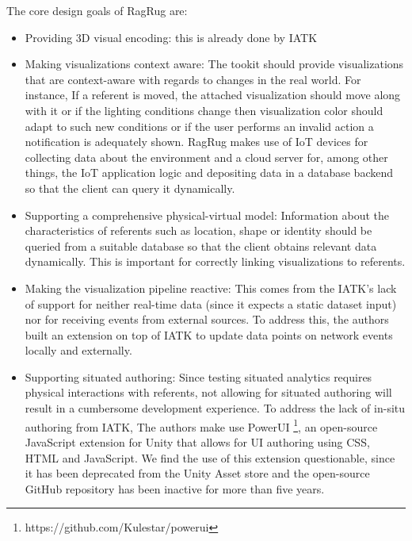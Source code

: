 \documentclass{vgtc}                          %
\begin{document}
\noindent The core design goals of RagRug are:
\begin{itemize}
	\item Providing 3D visual encoding: this is already done by IATK
	\item Making visualizations context aware:
	      The tookit should provide visualizations that are context-aware with regards
	      to changes in the real world. For instance, If a referent is moved, the attached
	      visualization should move along with it or if the lighting conditions change
	      then visualization color should adapt to such new conditions or if the user
	      performs an invalid action a notification is adequately shown. RagRug makes
	      use of IoT devices for collecting data about the environment and a cloud server
	      for, among other things, the IoT application logic and depositing data in a
	      database backend so that the client can query it dynamically.
	\item Supporting a comprehensive physical-virtual model: Information about the
	      characteristics of referents such as location, shape or identity should be
	      queried from a suitable database so that the client obtains relevant data
	      dynamically. This is important for correctly linking visualizations to
	      referents.
	\item Making the visualization pipeline reactive: This comes from the IATK's lack
	      of support for neither real-time data (since it expects a static dataset input)
	      nor for receiving events from external sources. To address this, the authors
	      built an extension on top of IATK to update data points on network events
	      locally and externally.
	\item Supporting situated authoring: Since testing situated analytics requires
	      physical interactions with referents, not allowing for situated authoring will
	      result in a cumbersome development experience. To address the lack of in-situ
	      authoring from IATK, The authors make use PowerUI
	      \footnote{https://github.com/Kulestar/powerui}, an open-source JavaScript extension
	      for Unity that allows for UI authoring using CSS, HTML and JavaScript. We find
	      the use of this extension questionable, since it has been deprecated from the
	      Unity Asset store and the open-source GitHub repository has been inactive for
	      more than five years.
\end{itemize}

\smallskip
\end{document}
